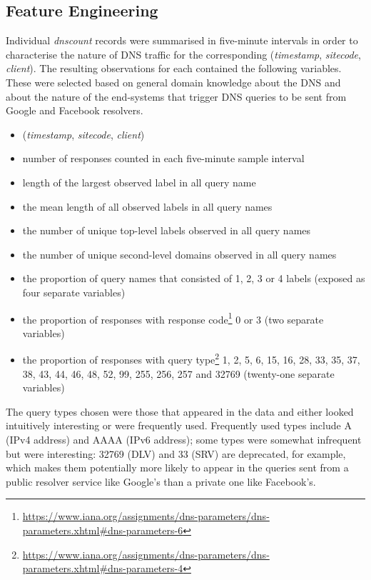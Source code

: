 \documentclass[conference]{IEEEtran}
\let\tightlist\relax %
\begin{document}
\subsection{Feature Engineering}\label{sec:feature-engineering}

\label{sec:datasetextraction}

Individual \emph{dnscount} records were summarised in five-minute
intervals in order to characterise the nature of DNS traffic for the
corresponding (\emph{timestamp}, \emph{sitecode}, \emph{client}). The
resulting observations for each contained the following variables. These
were selected based on general domain knowledge about the DNS and about
the nature of the end-systems that trigger DNS queries to be sent from
Google and Facebook resolvers.

\begin{itemize}
\tightlist
\item
  (\emph{timestamp}, \emph{sitecode}, \emph{client})
\item
  number of responses counted in each five-minute sample interval
\item
  length of the largest observed label in all query name
\item
  the mean length of all observed labels in all query names
\item
  the number of unique top-level labels observed in all query names
\item
  the number of unique second-level domains observed in all query names
\item
  the proportion of query names that consisted of 1, 2, 3 or 4 labels
  (exposed as four separate variables)
\item
  the proportion of responses with response
  code\footnote{\url{https://www.iana.org/assignments/dns-parameters/dns-parameters.xhtml\#dns-parameters-6}}
  0 or 3 (two separate variables)
\item
  the proportion of responses with query
  type\footnote{\url{https://www.iana.org/assignments/dns-parameters/dns-parameters.xhtml\#dns-parameters-4}}
  1, 2, 5, 6, 15, 16, 28, 33, 35, 37, 38, 43, 44, 46, 48, 52, 99, 255,
  256, 257 and 32769 (twenty-one separate variables)
\end{itemize}

The query types chosen were those that appeared in the data and either
looked intuitively interesting or were frequently used. Frequently used
types include A (IPv4 address) and AAAA (IPv6 address); some types were
somewhat infrequent but were interesting: 32769 (DLV) and 33 (SRV) are
deprecated, for example, which makes them potentially more likely to
appear in the queries sent from a public resolver service like Google's
than a private one like Facebook's.
\end{document}
